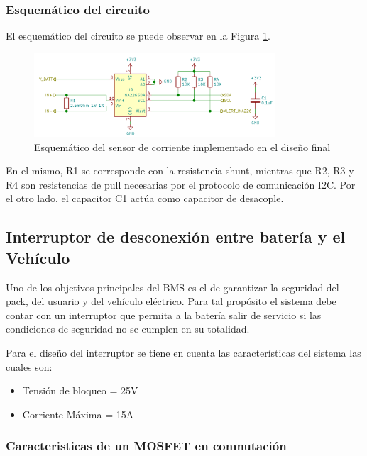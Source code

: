 \documentclass[10pt, a4paper]{article}
\begin{document}
\subsubsection{Esquem\'atico del circuito}

El esquem\'atico del circuito se puede observar en la Figura \ref{ina226_sch}.

\begin{figure}[h!]
    \begin{center}
        \includegraphics[width=0.8\textwidth]{ina226_sch.png}
        \caption{Esquem\'atico del sensor de corriente implementado en el diseño
                 final}
        \label{ina226_sch}
    \end{center}
\end{figure}

En el mismo, R1 se corresponde con la resistencia shunt, mientras que R2, R3 y
R4 son resistencias de pull necesarias por el protocolo de comunicaci\'on I2C.
Por el otro lado, el capacitor C1 act\'ua como capacitor de desacople.

\subsection{Interruptor de desconexión entre batería y el Vehículo}

Uno de los objetivos principales del BMS es el de garantizar la seguridad del
pack, del usuario y del vehículo eléctrico. Para tal propósito el sistema debe
contar con un interruptor que permita a la batería salir de servicio si las
condiciones de seguridad no se cumplen en su totalidad.

Para el diseño del interruptor se tiene en cuenta las características del
sistema las cuales son:

\begin{itemize}
	\item Tensión de bloqueo = 25V
	\item Corriente Máxima = 15A
\end{itemize}

\subsubsection{Caracteristicas de un MOSFET en conmutación}
\end{document}
